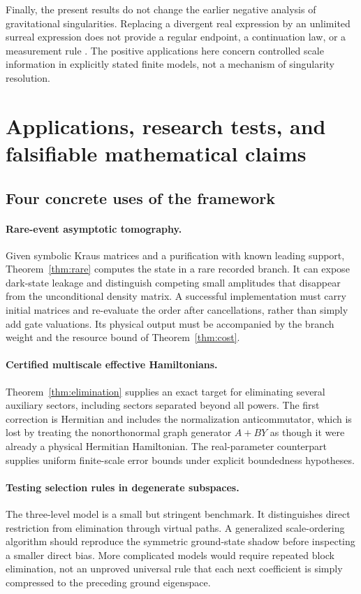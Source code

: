 \documentclass[11pt,oneside]{article}
\numberwithin{equation}{section}
\theoremstyle{plain}
\theoremstyle{definition}
\theoremstyle{remark}
\begin{document}
Finally, the present results do not change the earlier negative analysis of gravitational singularities. Replacing a divergent real expression by an unlimited surreal expression does not provide a regular endpoint, a continuation law, or a measurement rule \cite{repoPhysics}. The positive applications here concern controlled scale information in explicitly stated finite models, not a mechanism of singularity resolution.

\section{Applications, research tests, and falsifiable mathematical claims}\label{sec:applications}

\subsection{Four concrete uses of the framework}
\paragraph{Rare-event asymptotic tomography.}
Given symbolic Kraus matrices and a purification with known leading support, Theorem~\ref{thm:rare} computes the state in a rare recorded branch. It can expose dark-state leakage and distinguish competing small amplitudes that disappear from the unconditional density matrix. A successful implementation must carry initial matrices and re-evaluate the order after cancellations, rather than simply add gate valuations. Its physical output must be accompanied by the branch weight and the resource bound of Theorem~\ref{thm:cost}.

\paragraph{Certified multiscale effective Hamiltonians.}
Theorem~\ref{thm:elimination} supplies an exact target for eliminating several auxiliary sectors, including sectors separated beyond all powers. The first correction is Hermitian and includes the normalization anticommutator, which is lost by treating the nonorthonormal graph generator $A+BY$ as though it were already a physical Hermitian Hamiltonian. The real-parameter counterpart supplies uniform finite-scale error bounds under explicit boundedness hypotheses.

\paragraph{Testing selection rules in degenerate subspaces.}
The three-level model is a small but stringent benchmark. It distinguishes direct restriction from elimination through virtual paths. A generalized scale-ordering algorithm should reproduce the symmetric ground-state shadow before inspecting a smaller direct bias. More complicated models would require repeated block elimination, not an unproved universal rule that each next coefficient is simply compressed to the preceding ground eigenspace.
\end{document}
